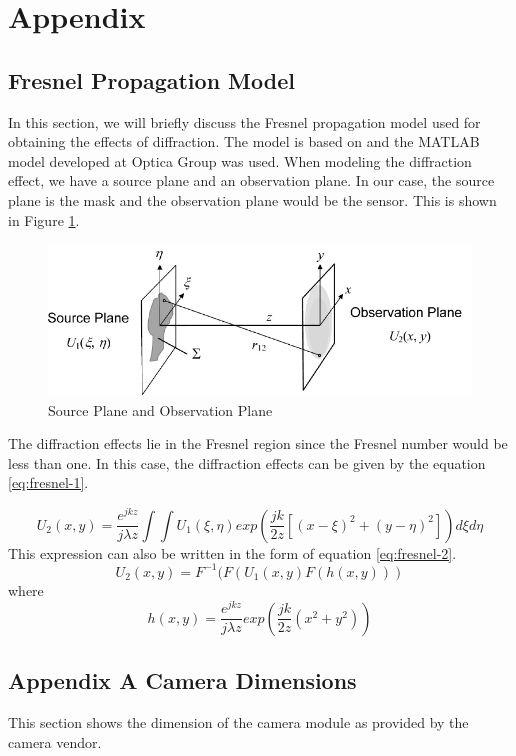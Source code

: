 \chapter*{Appendix}
\section*{Fresnel Propagation Model}
In this section, we will briefly discuss the Fresnel propagation model used for obtaining the effects of diffraction. The model is based on \cite{FourierOptics} and the MATLAB model developed at Optica Group was used. When modeling the diffraction effect, we have a source plane and an observation plane. In our case, the source plane is the mask and the observation plane would be the sensor. This is shown in Figure \ref{fig:fresnel_1}. 
\begin{figure}[!htbp]
\centering
\includegraphics[width = \linewidth]{pics/fresnel-1}
\caption{Source Plane and Observation Plane}
\label{fig:fresnel_1}
\end{figure}
The diffraction effects lie in the Fresnel region since the Fresnel number would be less than one. In this case, the diffraction effects can be given by the equation \ref{eq:fresnel-1}.

\begin{equation}
\label{eq:fresnel-1}
U_2(x,y) = \frac{e^{jkz}}{j\lambda z}\int \int U_1(\xi, \eta )exp(\frac{jk}{2z}[(x - \xi)^2 + (y - \eta)^2])d\xi d\eta
\end{equation}
This expression can also be written in the form of equation \ref{eq:fresnel-2}.
\begin{equation}
\label{eq:fresnel-2}
U_2(x,y) = F^{-1}(F(U_1(x,y)F(h(x,y)))
\end{equation}
where
\begin{equation}
\label{eq:fresnel-3}
h(x,y) = \frac{e^{jkz}}{j\lambda z}exp(\frac{jk}{2z}(x^2 + y^2))
\end{equation}

\section*{Appendix A Camera Dimensions}
This section shows the dimension of the camera module as provided by the camera vendor.

